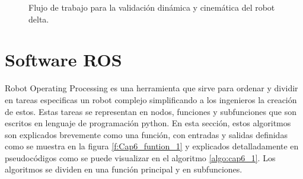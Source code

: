 \begin{center}
\begin{figure}[h!]
    \caption{Flujo de trabajo para la validación dinámica y cinemática del robot delta.}
    \label{fig:cap6_intro_2}
    \end{figure}
    \end{center}
     \newpage


\section{Software ROS}

    Robot Operating Processing es una herramienta que sirve para ordenar y dividir en tareas especificas un robot complejo simplificando a los ingenieros la creación de estos. Estas tareas se representan en nodos, funciones y subfunciones que son escritos en lenguaje de programación python. En esta sección, estos algoritmos son explicados brevemente como una función, con entradas y salidas definidas como se muestra en la figura \eqref{f:Cap6_funtion_1} y explicados detalladamente en pseudocódigos como se puede visualizar en el algoritmo \eqref{algo:cap6_1}. Los algoritmos se dividen en una función principal y en subfunciones.
    
